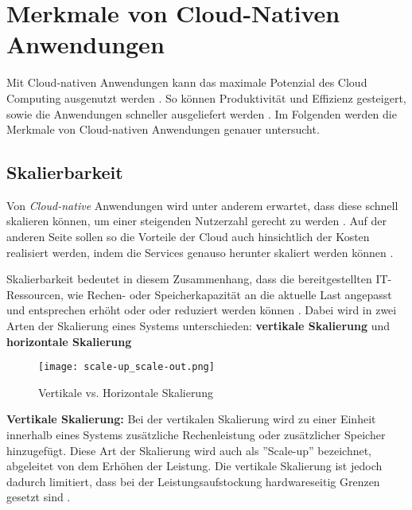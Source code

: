 \section{Merkmale von Cloud-Nativen Anwendungen}
\label{sec:cloud-native-anwendungen}
Mit Cloud-nativen Anwendungen kann das maximale Potenzial des Cloud Computing ausgenutzt werden \cite[Vgl.][]{VMwareb}. So können Produktivität und Effizienz gesteigert, sowie die Anwendungen schneller ausgeliefert werden \cite[Vgl][S. 12]{Chandrasekaran2022}. Im Folgenden werden die Merkmale von Cloud-nativen Anwendungen genauer untersucht.

\subsection{Skalierbarkeit}
Von \textit{Cloud-native} Anwendungen wird unter anderem erwartet, dass diese schnell skalieren können, um einer steigenden Nutzerzahl gerecht zu werden \cite[Vgl.][S. 1ff]{Armbrust2009}\cite[Vgl.][S. 234]{Villamizar2017}. Auf der anderen Seite sollen so die Vorteile der Cloud auch hinsichtlich der Kosten realisiert werden, indem die Services genauso herunter skaliert werden können \cite[Vgl.][S. 884]{Adzic2017}.

Skalierbarkeit bedeutet in diesem Zusammenhang, dass die bereitgestellten IT-Ressourcen, wie Rechen- oder Speicherkapazität an die aktuelle Last angepasst und entsprechen erhöht oder oder reduziert werden können \cite[Vgl.][S. 15]{Reinheimer2018}\cite[Vgl.][]{Geißler2019}. Dabei wird in zwei Arten der Skalierung eines Systems unterschieden: \textbf{vertikale Skalierung} und \textbf{horizontale Skalierung} \cite[Vgl.][]{Geißler2019}\cite[Vgl.][]{VMware}

\begin{figure}[H]
    \centering
    \texttt{[image: scale-up\_scale-out.png]}
    \caption{Vertikale vs. Horizontale Skalierung \cite[Nachbildung nach][]{Bachmann2019}}
    \label{fig:scale-up-scale-out}
\end{figure}
\pagebreak

\textbf{Vertikale Skalierung:}
Bei der vertikalen Skalierung wird zu einer Einheit innerhalb eines Systems zusätzliche Rechenleistung oder zusätzlicher Speicher hinzugefügt. Diese Art der Skalierung wird auch als ''Scale-up'' bezeichnet, abgeleitet von dem Erhöhen der Leistung. Die vertikale Skalierung ist jedoch dadurch limitiert, dass bei der Leistungsaufstockung hardwareseitig Grenzen gesetzt sind \cite[Vgl.][]{Geißler2019}\cite[Vgl.][]{VMware}.

